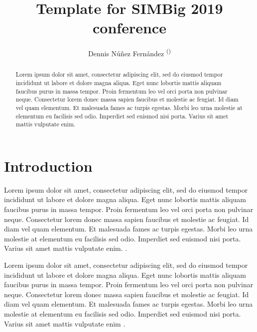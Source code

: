 \documentclass[runningheads]{llncs}
\begin{document}
%
\title{Template for SIMBig 2019 conference}
%
%
\author{
Dennis N\'u\~nez Fern\'andez \textsuperscript{(\Letter)} 
}
%
%
%
\maketitle              %
%
\begin{abstract}
Lorem ipsum dolor sit amet, consectetur adipiscing elit, sed do eiusmod tempor incididunt ut labore et dolore magna aliqua. Eget nunc lobortis mattis aliquam faucibus purus in massa tempor. Proin fermentum leo vel orci porta non pulvinar neque. Consectetur lorem donec massa sapien faucibus et molestie ac feugiat. Id diam vel quam elementum. Et malesuada fames ac turpis egestas. Morbi leo urna molestie at elementum eu facilisis sed odio. Imperdiet sed euismod nisi porta. Varius sit amet mattis vulputate enim.

\end{abstract}
%
%
%


\section{Introduction}

Lorem ipsum dolor sit amet, consectetur adipiscing elit, sed do eiusmod tempor incididunt ut labore et dolore magna aliqua. Eget nunc lobortis mattis aliquam faucibus purus in massa tempor. Proin fermentum leo vel orci porta non pulvinar neque. Consectetur lorem donec massa sapien faucibus et molestie ac feugiat. Id diam vel quam elementum. Et malesuada fames ac turpis egestas. Morbi leo urna molestie at elementum eu facilisis sed odio. Imperdiet sed euismod nisi porta. Varius sit amet mattis vulputate enim. \cite{b1}.

Lorem ipsum dolor sit amet, consectetur adipiscing elit, sed do eiusmod tempor incididunt ut labore et dolore magna aliqua. Eget nunc lobortis mattis aliquam faucibus purus in massa tempor. Proin fermentum leo vel orci porta non pulvinar neque. Consectetur lorem donec massa sapien faucibus et molestie ac feugiat. Id diam vel quam elementum. Et malesuada fames ac turpis egestas. Morbi leo urna molestie at elementum eu facilisis sed odio. Imperdiet sed euismod nisi porta. Varius sit amet mattis vulputate enim \cite{b2} \cite{b3} \cite{b4} \cite{b5}.
\end{document}
